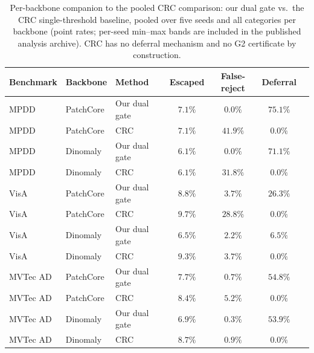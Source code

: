 \documentclass[preprint,11pt]{elsarticle}
\begin{document}
\begin{table}[htbp]
  \centering
  \small
  \caption{Per-backbone companion to the pooled CRC comparison: our dual gate vs.\ the CRC
  single-threshold baseline, pooled over five seeds and all categories per backbone (point rates;
  per-seed min--max bands are included in the published analysis archive). CRC has no
  deferral mechanism and no G2 certificate by construction.}
  \label{tab:crcbackbone}
  \begin{tabular}{@{}lllcccc@{}}
    \toprule
    Benchmark & Backbone & Method & Escaped & False-reject & Deferral \\
    \midrule
    MPDD & PatchCore & Our dual gate & $7.1\%$ & $0.0\%$ & $75.1\%$ \\
    MPDD & PatchCore & CRC & $7.1\%$ & $41.9\%$ & $0.0\%$ \\
    MPDD & Dinomaly  & Our dual gate & $6.1\%$ & $0.0\%$ & $71.1\%$ \\
    MPDD & Dinomaly  & CRC & $6.1\%$ & $31.8\%$ & $0.0\%$ \\
    \addlinespace
    VisA & PatchCore & Our dual gate & $8.8\%$ & $3.7\%$ & $26.3\%$ \\
    VisA & PatchCore & CRC & $9.7\%$ & $28.8\%$ & $0.0\%$ \\
    VisA & Dinomaly  & Our dual gate & $6.5\%$ & $2.2\%$ & $6.5\%$ \\
    VisA & Dinomaly  & CRC & $9.3\%$ & $3.7\%$ & $0.0\%$ \\
    \addlinespace
    MVTec AD & PatchCore & Our dual gate & $7.7\%$ & $0.7\%$ & $54.8\%$ \\
    MVTec AD & PatchCore & CRC & $8.4\%$ & $5.2\%$ & $0.0\%$ \\
    MVTec AD & Dinomaly  & Our dual gate & $6.9\%$ & $0.3\%$ & $53.9\%$ \\
    MVTec AD & Dinomaly  & CRC & $8.7\%$ & $0.9\%$ & $0.0\%$ \\
    \bottomrule
  \end{tabular}
\end{table}
\end{document}
